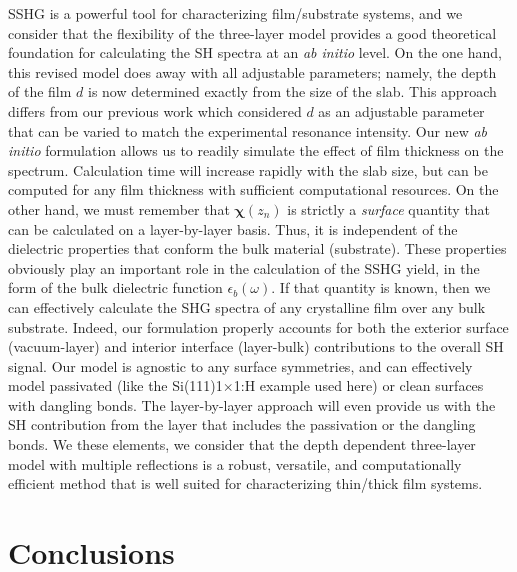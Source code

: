 \documentclass[utf8]{frontiersSCNS}
\begin{document}
{\color{red}
SSHG is a powerful tool for characterizing film/substrate systems, and we
consider that the flexibility of the three-layer model provides a good
theoretical foundation for calculating the SH spectra at an \emph{ab initio}
level. On the one hand, this revised model does away with all adjustable
parameters; namely, the depth of the film $d$ is now determined exactly from the
size of the slab. This approach differs from our previous work
\citep{andersonPRB16b} which considered $d$ as an adjustable parameter that can
be varied to match the experimental resonance intensity. Our new \emph{ab
initio} formulation allows us to readily simulate the effect of film thickness
on the spectrum. Calculation time will increase rapidly with the slab size, but
can be computed for any film thickness with sufficient computational resources.
On the other hand, we must remember that $\boldsymbol{\chi}(z_{n})$ is strictly
a \emph{surface} quantity that can be calculated on a layer-by-layer basis.
Thus, it is independent of the dielectric properties that conform the bulk
material (substrate). These properties obviously play an important role in the
calculation of the SSHG yield, in the form of the bulk dielectric function
$\epsilon_{b}(\omega)$. If that quantity is known, then we can effectively
calculate the SHG spectra of any crystalline film over any bulk substrate.
Indeed, our formulation properly accounts for both the exterior surface
(vacuum-layer) and interior interface (layer-bulk) contributions to the overall
SH signal. Our model is agnostic to any surface symmetries, and can effectively
model passivated (like the Si(111)1$\times$1:H example used here) or clean
surfaces with dangling bonds. The layer-by-layer approach will even provide us
with the SH contribution from the layer that includes the passivation or the
dangling bonds. We these elements, we consider that the depth dependent
three-layer model with multiple reflections is a robust, versatile, and
computationally efficient method that is well suited for characterizing
thin/thick film systems.
}



\section{Conclusions}\label{sec:conclusions}
\end{document}
